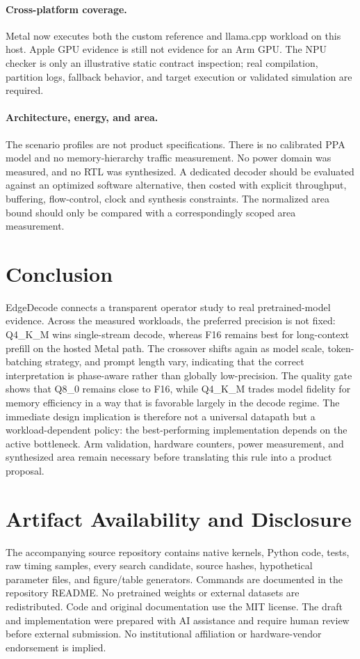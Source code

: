 \documentclass[11pt]{article}
\begin{document}
\paragraph{Cross-platform coverage.}
Metal now executes both the custom reference and llama.cpp workload on this host.
Apple GPU evidence is still not evidence for an Arm GPU. The NPU checker is only an
illustrative static contract inspection; real compilation, partition logs, fallback
behavior, and target execution or validated simulation are required.

\paragraph{Architecture, energy, and area.}
The scenario profiles are not product specifications. There is no calibrated PPA
model and no memory-hierarchy traffic measurement. No power domain was measured,
and no RTL was synthesized. A dedicated decoder should be evaluated against an
optimized software alternative, then costed with explicit throughput, buffering,
flow-control, clock and synthesis constraints. The normalized area bound should
only be compared with a correspondingly scoped area measurement.

\section{Conclusion}
EdgeDecode connects a transparent operator study to real pretrained-model evidence.
Across the measured workloads, the preferred precision is not fixed: Q4\_K\_M
wins single-stream decode, whereas F16 remains best for long-context prefill on the
hosted Metal path. The crossover shifts again as model scale, token-batching
strategy, and prompt length vary, indicating that the correct interpretation is
phase-aware rather than globally low-precision. The quality gate shows that Q8\_0
remains close to F16, while Q4\_K\_M trades model fidelity for memory efficiency
in a way that is favorable largely in the decode regime. The immediate design
implication is therefore not a universal datapath but a workload-dependent policy:
the best-performing implementation depends on the active bottleneck. Arm
validation, hardware counters, power measurement, and synthesized area remain
necessary before translating this rule into a product proposal.

\section*{Artifact Availability and Disclosure}
The accompanying source repository contains native kernels, Python code, tests,
raw timing samples, every search candidate, source hashes, hypothetical parameter
files, and figure/table generators. Commands are documented in the repository
README. No pretrained weights or external datasets are redistributed. Code and
original documentation use the MIT license. The draft and implementation were
prepared with AI assistance and require human review before external submission.
No institutional affiliation or hardware-vendor endorsement is implied.
\end{document}
